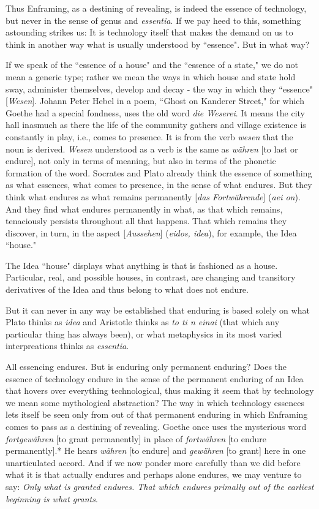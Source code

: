 Thus Enframing, as a destining of revealing, is indeed the essence of technology, but never in the sense of genus and \textit{essentia}. If we pay heed to this, something astounding strikes us: It is technology itself that makes the demand on us to think in another way what is usually understood by ``essence". But in what way?

If we speak of the ``essence of a house" and the ``essence of a state," we do not mean a generic type; rather we mean the ways in which house and state hold sway, administer themselves, develop and decay - the way in which they ``essence" [\textit{Wesen}]. Johann Peter Hebel in a poem, ``Ghost on Kanderer Street," for which Goethe had a special fondness, uses the old word \textit{die Weserei}. It means the city hall inasmuch as there the life of the community gathers and village existence is constantly in play, i.e., comes to presence. It is from the verb \textit{wesen} that the noun is derived. \textit{Wesen} understood as a verb is the same as \textit{w\"{a}hren} [to last or endure], not only in terms of meaning, but also in terms of the phonetic formation of the word. Socrates and Plato already think the essence of something as what essences, what comes to presence, in the sense of what endures. But they think what endures as what remains permanently [\textit{das Fortw\"{a}hrende}] (\textit{aei on}). And they find what endures permanently in what, as that which remains, tenaciously persists throughout all that happens. That which remains they discover, in turn, in the aspect [\textit{Aussehen}] (\textit{eidos, idea}), for example, the Idea ``house."

The Idea ``house" displays what anything is that is fashioned as a house. Particular, real, and possible houses, in contrast, are changing and transitory derivatives of the Idea and thus belong to what does not endure.

But it can never in any way be established that enduring is based solely on what Plato thinks as \textit{idea} and Aristotle thinks as \textit{to ti n einai} (that which any particular thing has always been), or what metaphysics in its most varied interpreations thinks as \textit{essentia}.

All essencing endures. But is enduring only permanent enduring? Does the essence of technology endure in the sense of the permanent enduring of an Idea that hovers over everything technological, thus making it seem that by technology we mean some mythological abstraction? The way in which technology essences lets itself be seen only from out of that permanent enduring in which Enframing comes to pass as a destining of revealing. Goethe once uses the mysterious word \textit{fortgew\"{a}hren} [to grant permanently] in place of \textit{fortw\"{a}hren} [to endure permanently].* He hears \textit{w\"{a}hren} [to endure] and \textit{gew\"{a}hren} [to grant] here in one unarticulated accord. And if we now ponder more carefully than we did before what it is that actually endures and perhaps alone endures, we may venture to say: \textit{Only what is granted endures. That which endures primally out of the earliest beginning is what grants}. 


